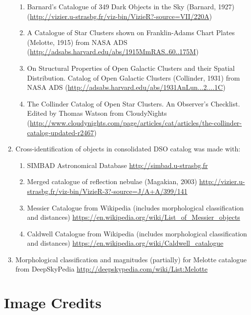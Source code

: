 \begin{enumerate}
\begin{enumerate}
     \item Barnard's Catalogue of 349 Dark Objects in the Sky    (Barnard, 1927)       (\url{http://vizier.u-strasbg.fr/viz-bin/VizieR?-source=VII/220A})
     \item A Catalogue of Star Clusters shown on Franklin-Adams Chart Plates (Melotte, 1915) from NASA ADS (\url{http://adsabs.harvard.edu/abs/1915MmRAS..60..175M})
     \item On Structural Properties of Open Galactic Clusters and their Spatial Distribution. Catalog of Open Galactic Clusters (Collinder, 1931)
	       from NASA ADS (\url{http://adsabs.harvard.edu/abs/1931AnLun...2....1C})
     \item The Collinder Catalog of Open Star Clusters. An Observer’s Checklist. Edited by Thomas Watson 
	       from CloudyNights (\url{http://www.cloudynights.com/page/articles/cat/articles/the-collinder-catalog-updated-r2467})
	\end{enumerate}
\item Cross-identification of objects in consolidated DSO catalog was made with:
	\begin{enumerate}
    \item  SIMBAD Astronomical Database \url{http://simbad.u-strasbg.fr}
    \item  Merged catalogue of reflection nebulae (Magakian, 2003) \url{http://vizier.u-strasbg.fr/viz-bin/VizieR-3?-source=J/A+A/399/141}
    \item  Messier  Catalogue from Wikipedia (includes morphological classification and distances) \url{https://en.wikipedia.org/wiki/List_of_Messier_objects}
    \item  Caldwell Catalogue from Wikipedia (includes morphological classification and distances) \url{https://en.wikipedia.org/wiki/Caldwell_catalogue}
	\end{enumerate}
\item Morphological classification and magnitudes (partially) for Melotte catalogue from DeepSkyPedia \url{http://deepskypedia.com/wiki/List:Melotte}

\end{enumerate}


\section{Image Credits}
\label{sec:ack:images}

